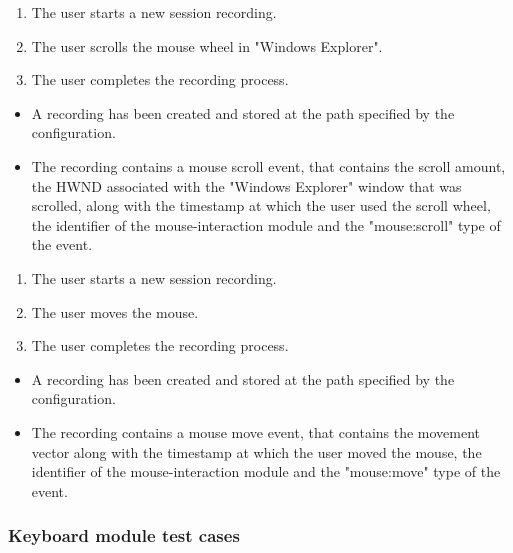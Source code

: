 \begin{tests}
\newpage
	{\begin{enumerate}
		\item The \gls{user} starts a new \gls{session} recording.
		\item The \gls{user} scrolls the mouse wheel in "Windows Explorer".
		\item The \gls{user} completes the recording process.
	\end{enumerate}}
	{\begin{itemize}
		\item A recording has been created and stored at the path specified by the configuration.
		\item The recording contains a mouse scroll \gls{event},  that contains the scroll amount, the HWND associated with the "Windows Explorer" window that was scrolled, along with the timestamp at which the \gls{user} used the scroll wheel, the identifier of the mouse-interaction module and the "mouse:scroll" type of the event.
	\end{itemize}}
	
	{\begin{enumerate}
		\item The \gls{user} starts a new \gls{session} recording.
		\item The \gls{user} moves the mouse.
		\item The \gls{user} completes the recording process.
	\end{enumerate}}
	{\begin{itemize}
		\item A recording has been created and stored at the path specified by the configuration.
		\item The recording contains a mouse move \gls{event},  that contains the movement vector along with the timestamp at which the \gls{user} moved the mouse, the identifier of the mouse-interaction module and the "mouse:move" type of the event.
	\end{itemize}}
\end{tests}

\newpage
\subsubsection{Keyboard module test cases}

